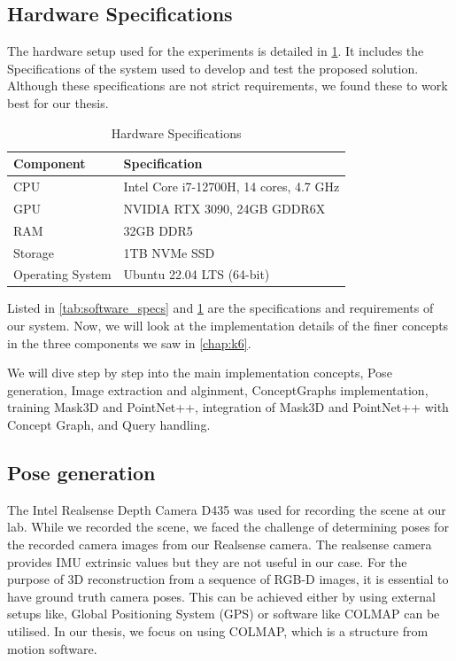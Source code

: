 \subsection{Hardware Specifications}
The hardware setup used for the experiments is detailed in \ref{tab:hardware_specs}. It includes the Specifications of the system
used to develop and test the proposed solution. Although these specifications are not strict requirements, we found these to work best for our
thesis.

\begin{table}[ht]
    \centering
    \caption{Hardware Specifications}
    \label{tab:hardware_specs}
    \begin{tabular}{ll}
        \toprule
        \textbf{Component}      & \textbf{Specification}              \\
        \midrule
        CPU                     & Intel Core i7-12700H, 14 cores, 4.7 GHz \\
        GPU                     & NVIDIA RTX 3090, 24GB GDDR6X          \\
        RAM                     & 32GB DDR5                             \\
        Storage                 & 1TB NVMe SSD                          \\
        Operating System        & Ubuntu 22.04 LTS (64-bit)             \\
        \bottomrule
    \end{tabular}
\end{table}



Listed in \cref{tab:software_specs} and \cref{tab:hardware_specs} are the specifications and requirements of our system. Now, we will look at the implementation details of the finer concepts in the 
three components we saw in \cref{chap:k6}.

We will dive step by step into the main implementation concepts, Pose generation, Image extraction and alginment, ConceptGraphs implementation, 
training Mask3D and PointNet++, integration of Mask3D and PointNet++ with Concept Graph, and Query handling.

\subsection{Pose generation}
The Intel Realsense Depth Camera D435 \cite{camera} was used for recording the scene at our lab. 
While we recorded the scene, we faced the challenge of determining poses for the recorded camera images from our Realsense camera. The realsense camera provides IMU extrinsic
values but they are not useful in our case. For the purpose of 3D reconstruction from a sequence of RGB-D images, it is essential to have ground truth camera poses. This 
can be achieved either by using external setups like, Global Positioning System (GPS) or software like COLMAP can be utilised. In our thesis, we focus on using COLMAP,
which is a structure from motion software. 

